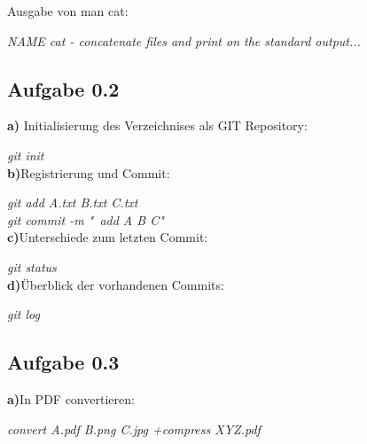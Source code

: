 \documentclass[a4paper,graphics,11pt]{article}
\newcommand{\aufgabe}[1]{\subsection*{Aufgabe #1}}
\begin{document}
Ausgabe von man cat:

\textit{NAME cat - concatenate files and print on the standard output...}\\

\aufgabe{0.2}

\textbf{a)} Initialisierung des Verzeichnises als GIT Repository:

\textit{git init}\\

\textbf{b)}Registrierung und Commit:

\textit{git add A.txt B.txt C.txt \\
	git commit -m "\ add A B C"}\\

\textbf{c)}Unterschiede zum letzten Commit:

\textit{git status}\\

\textbf{d)}Überblick der vorhandenen Commits:

\textit{git log}\\

\aufgabe{0.3}

\textbf{a)}In PDF convertieren:

\textit{convert A.pdf B.png C.jpg +compress XYZ.pdf}\\
\end{document}
